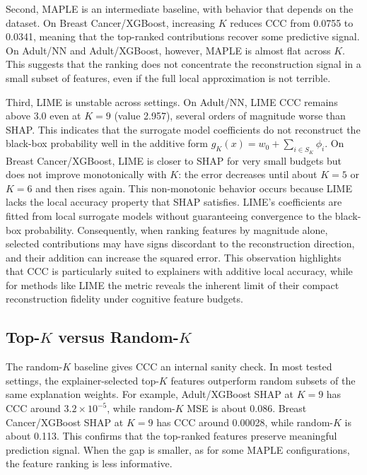 \documentclass[sigconf,nonacm]{acmart}
\begin{document}
Second, MAPLE is an intermediate baseline, with behavior that depends on the
dataset. On Breast Cancer/XGBoost, increasing $K$ reduces CCC from 0.0755 to
0.0341, meaning that the top-ranked contributions recover some predictive
signal. On Adult/NN and Adult/XGBoost, however, MAPLE is almost flat across
$K$. This suggests that the ranking does not concentrate the reconstruction
signal in a small subset of features, even if the full local approximation is
not terrible.

Third, LIME is unstable across settings. On Adult/NN, LIME CCC remains above
3.0 even at $K=9$ (value 2.957), several orders of magnitude worse than SHAP. This indicates
that the surrogate model coefficients do not reconstruct the black-box probability
well in the additive form $g_K(x)=w_0+\sum_{i\in S_K}\phi_i$. On Breast Cancer/XGBoost,
LIME is closer to SHAP for very small budgets but does not improve monotonically
with $K$: the error decreases until about $K=5$ or $K=6$ and then rises again.
This non-monotonic behavior occurs because LIME lacks the local accuracy property
that SHAP satisfies. LIME's coefficients are fitted from local surrogate models
without guaranteeing convergence to the black-box probability. Consequently, when
ranking features by magnitude alone, selected contributions may have signs discordant
to the reconstruction direction, and their addition can increase the squared error.
This observation highlights that CCC is particularly suited to explainers with
additive local accuracy, while for methods like LIME the metric reveals the inherent
limit of their compact reconstruction fidelity under cognitive feature budgets.

\subsection{Top-$K$ versus Random-$K$}
The random-$K$ baseline gives CCC an internal sanity check. In most tested
settings, the explainer-selected top-$K$ features outperform random subsets of
the same explanation weights. For example, Adult/XGBoost SHAP at $K=9$ has CCC
around $3.2 \times 10^{-5}$, while random-$K$ MSE is about 0.086. Breast
Cancer/XGBoost SHAP at $K=9$ has CCC around 0.00028, while random-$K$ is about
0.113. This confirms that the top-ranked features preserve meaningful
prediction signal. When the gap is smaller, as for some MAPLE configurations,
the feature ranking is less informative.
\end{document}
